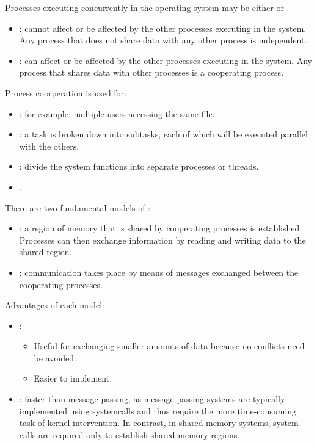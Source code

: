   \par Processes executing concurrently in the operating system may be either  or .
  \begin{itemize}
    \item {}: cannot affect or be affected by the other processes executing in the system. Any process that does not share data with any other process is independent.
    \item {}: can affect or be affected by the other processes executing in the system. Any process that shares data with other processes is a cooperating process.
  \end{itemize}
  \par Process coorperation is used for:
    \begin{itemize}
      \item {}: for example: multiple users accessing the same file.
      \item {}: a task is broken down into subtasks, each of which will be executed parallel with the others.
      \item {}: divide the system functions into separate processes or threads.
      \item {}.
    \end{itemize}
  \par There are two fundamental models of :
  \begin{itemize}
    \item {}:  a region of memory that is shared by cooperating processes is established. Processes can then exchange information by reading and writing data to the shared region.
    \item {}: communication takes place by means of messages exchanged between the cooperating processes.
  \end{itemize}
  \par Advantages of each model:
  \begin{itemize}
    \item {}:
      \begin{itemize}
        \item Useful for exchanging smaller amounts of data because no conflicts need be avoided.
        \item Easier to implement.
      \end{itemize}
    \item {}: faster than message passing, as message passing systems are typically implemented using systemcalls and thus require the more time-consuming task of kernel intervention. In contrast, in shared memory systems, system calls are required only to establish shared memory regions.
  \end{itemize}

